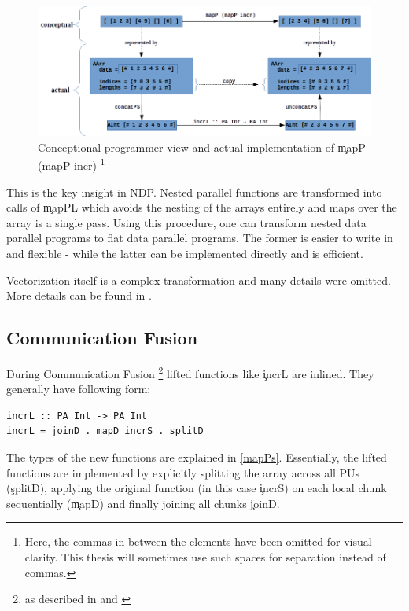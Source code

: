     \begin{figure}[h!]
        \begin{center}
        \includegraphics[width=\linewidth]{mapP.png}
        \caption{Conceptional programmer view and actual implementation of \c{mapP (mapP incr)}
        \footnote{Here, the commas in-between the elements have been omitted for visual clarity.
        This thesis will sometimes use such spaces for separation
        instead of commas.
        }
        }
        \label{figure:mapP}
        \end{center}
    \end{figure}
    
    This is the key insight in NDP. Nested parallel functions are
    transformed into calls of \c{mapPL} which avoids the nesting of
    the arrays entirely and maps over the array is a single pass.
    Using this procedure, one can transform nested data parallel programs
    to flat data parallel programs. The former is easier to write in and flexible
    - while the latter can be implemented directly and is efficient.
            
    Vectorization itself is a complex transformation and many details were omitted.
    More details can be found in \cite{Harness2008}.
    
  \subsection{Communication Fusion}
    During Communication Fusion
    \footnote{as described in
    \cite{DistTypes1999} and \cite{TypesNested2000}
    }
    lifted functions like \c{incrL} are inlined.
    They generally have following form:
    \begin{lstlisting}
incrL :: PA Int -> PA Int
incrL = joinD . mapD incrS . splitD
    \end{lstlisting}
    The types of the new functions are explained in \ref{mapPs}.
    Essentially, the lifted functions are implemented by explicitly
    splitting the array across all PUs (\c{splitD}), applying the original
    function (in this case \c{incrS}) on each local chunk sequentially (\c{mapD})
    and finally joining all chunks {\c{joinD}}.
    
